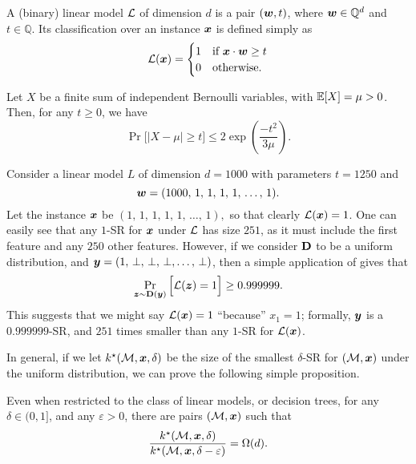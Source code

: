 \begin{definition}
	A (binary) linear model $\mathcal{L}$ of dimension $d$ is a pair $({\bm{w}}, t)$, where ${\bm{w}} \in \mathbb{Q}^d$ and $t \in \mathbb{Q}$. Its classification over an instance ${\bm{x}}$ is defined simply as 
	\[
		\mathcal{L}({\bm{x}}) = \begin{cases}
			1 & \text{if } {\bm{x}} \cdot {\bm{w}} \geq t\\
			0 & \text{otherwise}.
		\end{cases}
	\]
	\label{def:linear-models}
\end{definition}

\begin{lemma}
Let $X$ be a finite sum of independent Bernoulli variables, with $\mathbb{E}[X] = \mu > 0$. Then, for any $t \geq 0$, we have
\[
\Pr \Big[ \left|X - \mu\right| \geq t \Big] \leq 2\exp\left(\frac{-t^2}{3 \mu} \right).
\] 

\label{lemma:chernoff}	
\end{lemma}

\begin{example}

Consider a linear model $L$ of dimension $d= 1000$ with parameters $t = 1250$ and
$$
	{\bm{w}} = (
		1000, \, 1, \, 1, \,  1, \,  1, \,  \ldots, \, 1
	).
$$
Let the instance ${\bm{x}}$ be 
	$(
		1, \, 1, \, 1, \,  1, \,  1, \,  \ldots, \, 1
	),$ so that clearly $\mathcal{L}({\bm{x}}) = 1$.
One can easily see that any $1$-SR for ${\bm{x}}$ under $\mathcal{L}$ has size $251$, as it must include the first feature and any $250$ other features.
However, if we consider $\mathbf{D}$ to be a uniform distribution, and ${\bm{y}} = (
		1, \, \bot, \, \bot, \,  \bot,  \ldots, \, \bot
	)$, then a simple application of  gives that
\[
	\Pr_{{\bm{z}} \sim \mathbf{D}({\bm{y}})}\Big[ \mathcal{L}({\bm{z}}) = 1\Big] \geq  0.999999.\]
	This suggests that we might say $\mathcal{L}({\bm{x}}) = 1$ ``because'' $x_1 = 1$; formally, ${\bm{y}}$ is a $0.999999$-SR, and $251$ times smaller than any $1$-SR for $\mathcal{L}({\bm{x}})$.
\label{ex:delta-sr-size}
\end{example}

In general, if we let $k^\star(\mathcal{M}, {\bm{x}}, \delta)$ be the size of the smallest $\delta$-SR for $(\mathcal{M}, {\bm{x}})$ under the uniform distribution, we can prove the following simple proposition.

\begin{proposition}
	Even when restricted to the class of linear models, or decision trees, for any $\delta \in (0, 1]$, and any $\varepsilon > 0$, there are pairs $(\mathcal{M}, {\bm{x}})$  such that
	\[ 
		\frac{k^\star(\mathcal{M}, {\bm{x}}, \delta)}{k^\star(\mathcal{M}, {\bm{x}}, \delta-\varepsilon)} = \Omega(d).
	\]
\end{proposition}
